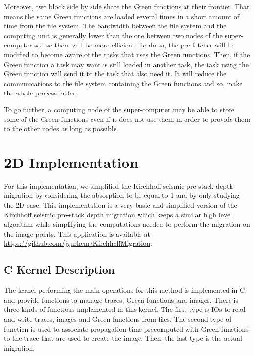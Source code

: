 Moreover, two block side by side share the Green functions at their frontier.
That means the same Green functions are loaded several times in a short amount of time from the file system.
The bandwidth between the file system and the computing unit is generally lower than the one between two nodes of the super-computer so use them will be more efficient.
To do so, the pre-fetcher will be modified to become aware of the tasks that uses the Green functions.
Then, if the Green function a task may want is still loaded in another task, the task using the Green function will send it to the task that also need it.
It will reduce the communications to the file system containing the Green functions and so, make the whole process faster.

To go further, a computing node of the super-computer may be able to store some of the Green functions even if it does not use them in order to provide them to the other nodes as long as possible.

\section{2D Implementation}

For this implementation, we simplified the Kirchhoff seismic pre-stack depth migration by considering the absorption to be equal to 1 and by only studying the 2D case.
This implementation is a very basic and simplified version of the Kirchhoff seismic pre-stack depth migration which keeps a similar high level algorithm while simplifying the computations needed to perform the migration on the image points.
This application is available at \url{https://github.com/jgurhem/KirchhoffMigration}.

\subsection{C Kernel Description}
The kernel performing the main operations for this method is implemented in C and provide functions to manage traces, Green functions and images.
There is three kinds of functions implemented in this kernel.
The first type is IOs to read and write traces, images and Green functions from files.
The second type of function is used to associate propagation time precomputed with Green functions to the trace that are used to create the image.
Then, the last type is the actual migration.

